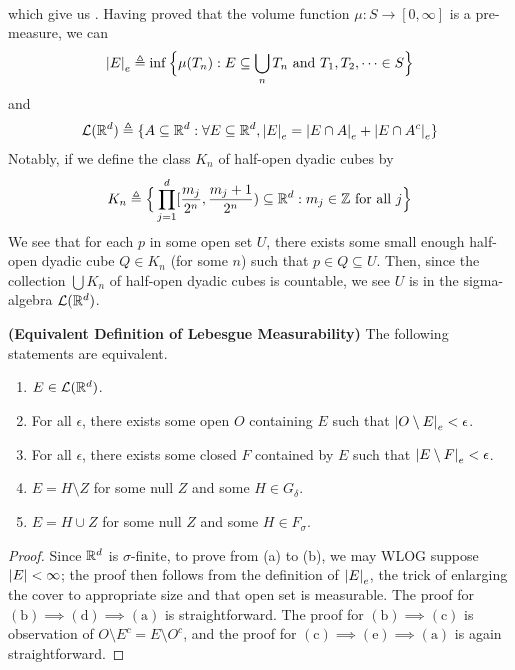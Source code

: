 \documentclass{report}
\begin{document}
\begin{mdframed}
\begin{align*}
\end{align*}
which give us . Having proved that the volume function $\mu : S\rightarrow [0,\infty]$ is a pre-measure, we can 
\begin{align*}
\left|E\right|_e \triangleq \inf \Big\{  \mu (T_n) : E \subseteq \bigcup_ n T_n \text{ and }T_1,T_2,\dots  \in S \Big\}
\end{align*}
and  
\begin{align*}
\mathcal{L}(\mathbb{R}^d)\triangleq \{ A \subseteq \mathbb{R}^d: \forall E \subseteq \mathbb{R}^d, \left|E\right|_e= \left|E\cap A\right|_e + \left|E\cap A^c\right|_e \}
\end{align*}
Notably, if we define the class $K_n$ of half-open dyadic cubes by 
\begin{align*}
K_n \triangleq \Big\{ \prod_{j=1}^{d} [\frac{m_j}{2^n}, \frac{m_j+1}{2^n})\subseteq \mathbb{R}^d: m_j \in\mathbb{Z} \text{ for all }j \Big\}
\end{align*}
We see that for each $p$ in some open set $U$, there exists some small enough half-open dyadic cube $Q\in K_n$ (for some $n$) such that $p \in Q \subseteq U$. Then, since the collection $\bigcup K_n$ of half-open dyadic cubes is countable, we see $U$ is in the sigma-algebra  $\mathcal{L}(\mathbb{R}^d)$. 
\end{mdframed}
\begin{theorem}
\label{Equivalent Definition of Lebesgue Measurability}
\textbf{(Equivalent Definition of Lebesgue Measurability)} The following statements are equivalent. 
\begin{enumerate}[label=(\alph*)]
  \item $E\in \mathcal{L}(\mathbb{R}^d)$. 
  \item For all $\epsilon $, there exists some open $O$ containing $E$ such that  $\left|O\setminus E\right|_e< \epsilon $. 
  \item For all $\epsilon $, there exists some closed $F$ contained by $E$ such that $\left|E\setminus F\right|_e<\epsilon $. 
  \item $E= H \setminus Z$ for some null $Z$ and some $H \in G_\delta$.  
  \item $E=H \cup Z$ for some null $Z$ and some $H\in F_\sigma$. 
\end{enumerate}
\end{theorem}
\begin{proof}
Since $\mathbb{R}^d$ is  $\sigma$-finite, to prove from (a) to (b), we may WLOG suppose $\left|E\right|<\infty$; the proof then follows from the definition of $\left|E\right|_e$, the trick of enlarging the cover to appropriate size and that open set is measurable. The proof for $(\text{b})\implies (\text{d})\implies (\text{a})$ is straightforward. The proof for $(\text{b})\implies (\text{c})$ is observation of $O \setminus E^c= E\setminus O^c$, and the proof for  $(\text{c})\implies (\text{e})\implies (\text{a})$ is again straightforward.
\end{proof}
\end{document}
